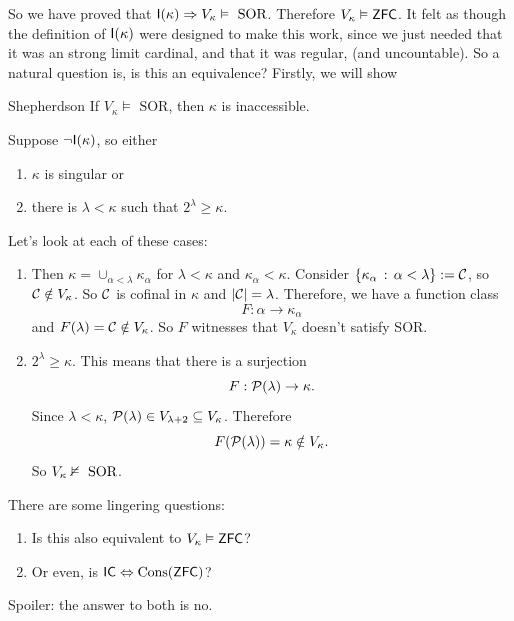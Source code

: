 \documentclass{article}
\begin{document}
\newlec
So we have proved that $\mathsf{I}(\kappa) \Rightarrow V_{\kappa} \vDash \text{ SOR}$. Therefore $V_{\kappa} \vDash \mathsf{ZFC}$. It felt as though the definition of $\mathsf{I}(\kappa)$ were designed to make this work, since we just needed that it was an strong limit cardinal, and that it was regular, (and uncountable). So a natural question is, is this an equivalence?
Firstly, we will show \begin{fancythm}{Shepherdson}
    If $V_{\kappa} \models \text{ SOR}$, then $\kappa$ is inaccessible.
\end{fancythm}
\proof Suppose $\neg \mathsf{I}(\kappa)$, so either \begin{enumerate} \item $\kappa$ is singular or
    \item there is $\lambda < \kappa$ such that $2^{\lambda} \geq \kappa$. \end{enumerate}
    Let's look at each of these cases:
     \begin{enumerate}
    \item Then $\kappa = \cup_{\alpha < \lambda} \kappa_{\alpha}$ for $\lambda < \kappa$ and $\kappa_{\alpha} < \kappa$. \gap Consider $\{\kappa_{\alpha} \, : \, \alpha< \lambda\} := \mathcal{C}$, so $\mathcal{C} \notin V_{\kappa}$. So $\mathcal{C}$ is cofinal in $\kappa$ and $|\mathcal{C}| = \lambda$. Therefore, we have a function class \[ F : \alpha \to \kappa_{\alpha}\] and $F(\lambda) = \mathcal{C} \notin V_{\kappa}$. So $F$ witnesses that $V_{\kappa}$ doesn't satisfy SOR.
    \item $2^{\lambda} \geq \kappa$. This means that there is a surjection \[ F : \mathcal{P}(\lambda) \to \kappa.\]
    Since $\lambda < \kappa$, $\mathcal{P}(\lambda) \in V_{\lambda+2} \subseteq V_{\kappa}$. Therefore \[ F(\mathcal{P}(\lambda)) = \kappa \notin V_{\kappa}.\] So $V_{\kappa} \nvDash \text{ SOR}$.
\end{enumerate}
\endproof
There are some lingering questions: \begin{enumerate}
    \item Is this also equivalent to $V_{\kappa} \vDash \mathsf{ZFC}$?
    \item Or even, is $\mathsf{IC} \Leftrightarrow \operatorname{Cons}(\mathsf{ZFC})$?
\end{enumerate}
Spoiler: the answer to both is no.\gap
\end{document}

